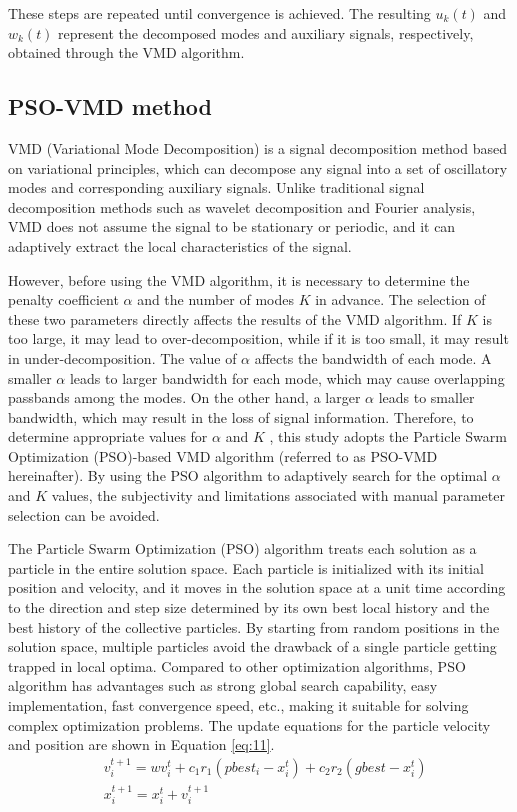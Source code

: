 \documentclass[3p,authoryear,preprint,12pt]{elsarticle}
\begin{document}
These steps are repeated until convergence is achieved. The resulting $u_k(t)$  and $w_k(t)$ represent the decomposed modes and auxiliary signals, respectively, obtained through the VMD algorithm.
\fi
\subsection{PSO-VMD method}

VMD (Variational Mode Decomposition) \citep{dragomiretskiyVariationalModeDecomposition2014} is a signal decomposition method based on variational principles, which can decompose any signal into a set of oscillatory modes and corresponding auxiliary signals. Unlike traditional signal decomposition methods such as wavelet decomposition and Fourier analysis, VMD does not assume the signal to be stationary or periodic, and it can adaptively extract the local characteristics of the signal.

However, before using the VMD algorithm, it is necessary to determine the penalty coefficient $\alpha$  and the number of modes $K$  in advance. The selection of these two parameters directly affects the results of the VMD algorithm. If $K$  is too large, it may lead to over-decomposition, while if it is too small, it may result in under-decomposition. The value of $\alpha$  affects the bandwidth of each mode. A smaller $\alpha$  leads to larger bandwidth for each mode, which may cause overlapping passbands among the modes. On the other hand, a larger $\alpha$  leads to smaller bandwidth, which may result in the loss of signal information. Therefore, to determine appropriate values for $\alpha$  and $K$ , this study adopts the Particle Swarm Optimization (PSO)-based VMD algorithm (referred to as PSO-VMD hereinafter). By using the PSO algorithm to adaptively search for the optimal $\alpha$  and $K$  values, the subjectivity and limitations associated with manual parameter selection can be avoided.

The Particle Swarm Optimization (PSO) algorithm treats each solution as a particle in the entire solution space. Each particle is initialized with its initial position and velocity, and it moves in the solution space at a unit time according to the direction and step size determined by its own best local history and the best history of the collective particles. By starting from random positions in the solution space, multiple particles avoid the drawback of a single particle getting trapped in local optima. Compared to other optimization algorithms, PSO algorithm has advantages such as strong global search capability, easy implementation, fast convergence speed, etc., making it suitable for solving complex optimization problems. The update equations for the particle velocity and position are shown in Equation \ref{eq:11}.
\begin{equation}
	\label{eq:11}
	\begin{split}
		& v_{i}^{t+1} = w v_{i}^t + c_1 r_1 (pbest_{i} - x_{i}^t) + c_2 r_2 (gbest - x_{i}^t) \\
		& x_{i}^{t+1} = x_i^t + v_i^{t+1}
	\end{split}
\end{equation}
\end{document}
